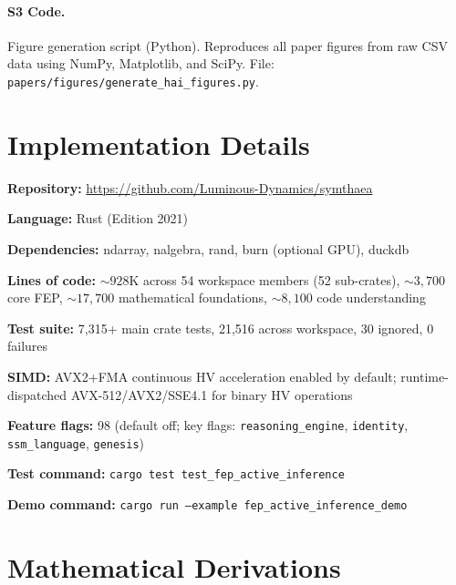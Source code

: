 \documentclass[10pt,letterpaper]{article}
\begin{document}
\paragraph*{S3 Code.}
\label{s3-code}
{Figure generation script (Python). Reproduces all paper figures from raw CSV
data using NumPy, Matplotlib, and SciPy. File:
\texttt{papers/figures/generate\_hai\_figures.py}.}




\appendix

\section{Implementation Details}
\label{app:implementation}

{\raggedright
\textbf{Repository:} \url{https://github.com/Luminous-Dynamics/symthaea}\par
\textbf{Language:} Rust (Edition 2021)\par
\textbf{Dependencies:} ndarray, nalgebra, rand, burn (optional GPU), duckdb\par
\textbf{Lines of code:} ${\sim}928$K across 54 workspace members (52 sub-crates), ${\sim}3{,}700$ core FEP, ${\sim}17{,}700$ mathematical foundations, ${\sim}8{,}100$ code understanding\par
\textbf{Test suite:} 7,315+ main crate tests, 21,516 across workspace, 30 ignored, 0 failures\par
\textbf{SIMD:} AVX2+FMA continuous HV acceleration enabled by default; runtime-dispatched AVX-512/AVX2/SSE4.1 for binary HV operations\par
\textbf{Feature flags:} 98 (default off; key flags: \texttt{reasoning\_engine}, \texttt{identity}, \texttt{ssm\_language}, \texttt{genesis})\par
\textbf{Test command:} \texttt{cargo test test\_fep\_active\_inference}\par
\textbf{Demo command:} \texttt{cargo run --example fep\_active\_inference\_demo}\par
}

\section{Mathematical Derivations}
\label{app:derivations}
\end{document}
